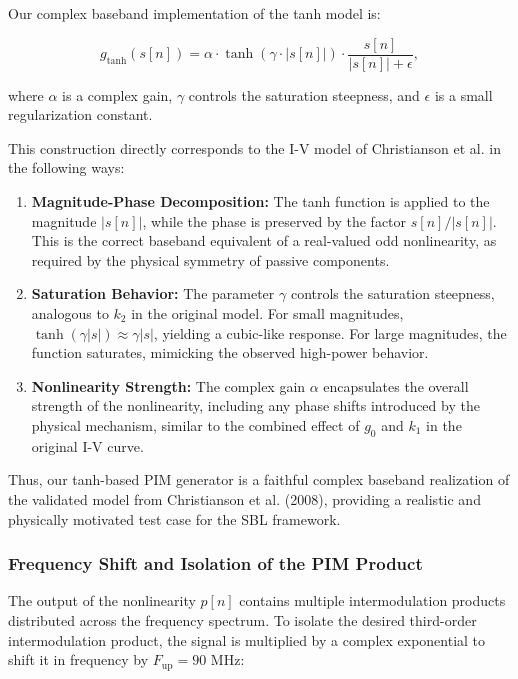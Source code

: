 Our complex baseband implementation of the tanh model is:

\begin{equation}
g_{\mathrm{tanh}}(s[n]) = \alpha \cdot \tanh\left(\gamma \cdot |s[n]|\right) \cdot \frac{s[n]}{|s[n]| + \epsilon},
\end{equation}

where \(\alpha\) is a complex gain, \(\gamma\) controls the saturation steepness, and \(\epsilon\) is a small regularization constant.

This construction directly corresponds to the I-V model of Christianson et al. in the following ways:

\begin{enumerate}
    \item \textbf{Magnitude-Phase Decomposition:} The tanh function is applied to the magnitude \(|s[n]|\), while the phase is preserved by the factor \(s[n]/|s[n]|\). This is the correct baseband equivalent of a real-valued odd nonlinearity, as required by the physical symmetry of passive components.
    \item \textbf{Saturation Behavior:} The parameter \(\gamma\) controls the saturation steepness, analogous to \(k_2\) in the original model. For small magnitudes, \(\tanh(\gamma |s|) \approx \gamma |s|\), yielding a cubic-like response. For large magnitudes, the function saturates, mimicking the observed high-power behavior.
    \item \textbf{Nonlinearity Strength:} The complex gain \(\alpha\) encapsulates the overall strength of the nonlinearity, including any phase shifts introduced by the physical mechanism, similar to the combined effect of \(g_0\) and \(k_1\) in the original I-V curve.
\end{enumerate}

Thus, our tanh-based PIM generator is a faithful complex baseband realization of the validated model from Christianson et al. (2008), providing a realistic and physically motivated test case for the SBL framework.

\subsubsection{Frequency Shift and Isolation of the PIM Product}

The output of the nonlinearity \( p[n] \) contains multiple intermodulation products distributed across the frequency spectrum. To isolate the desired third-order intermodulation product, the signal is multiplied by a complex exponential to shift it in frequency by \( F_{\mathrm{up}} = 90 \) MHz:

